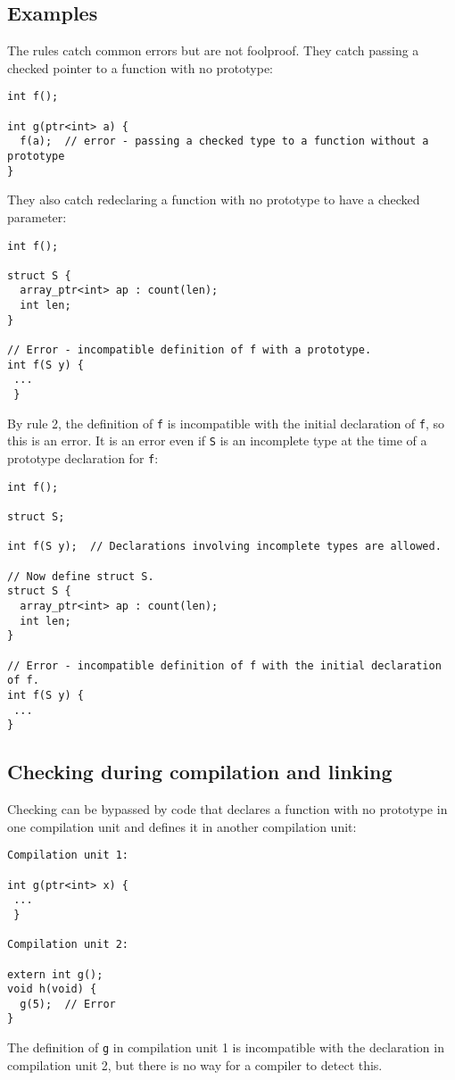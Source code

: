 \subsection{Examples}
The rules catch common errors but are not foolproof.  They catch passing a checked pointer
to a function with no prototype:
\begin{verbatim}
int f();

int g(ptr<int> a) {
  f(a);  // error - passing a checked type to a function without a prototype
}
\end{verbatim}
They also catch redeclaring a function with no prototype to have a checked parameter:
\begin{verbatim}
int f();

struct S {
  array_ptr<int> ap : count(len);
  int len;
}

// Error - incompatible definition of f with a prototype.
int f(S y) {
 ...
 }
\end{verbatim}
By rule 2, the definition of \verb+f+ is incompatible with the initial
declaration of \verb+f+, so this is an error.  It is an error even
if \verb+S+ is an incomplete type at the time of
a prototype declaration for \verb+f+:
\begin{verbatim} 
int f();

struct S;

int f(S y);  // Declarations involving incomplete types are allowed.

// Now define struct S.
struct S {
  array_ptr<int> ap : count(len);
  int len;
}

// Error - incompatible definition of f with the initial declaration of f.
int f(S y) {
 ...
}
\end{verbatim}

\subsection{Checking during compilation and linking}
Checking can be bypassed by code that declares a function with no prototype in one 
compilation unit and defines it in another compilation unit:
\begin{verbatim}
Compilation unit 1:

int g(ptr<int> x) {
 ...
 }

Compilation unit 2:

extern int g();
void h(void) {
  g(5);  // Error
}
\end{verbatim}
The definition of \verb+g+ in compilation unit 1 is incompatible with
the declaration in compilation unit 2, but there is no way for a compiler
to detect this.


